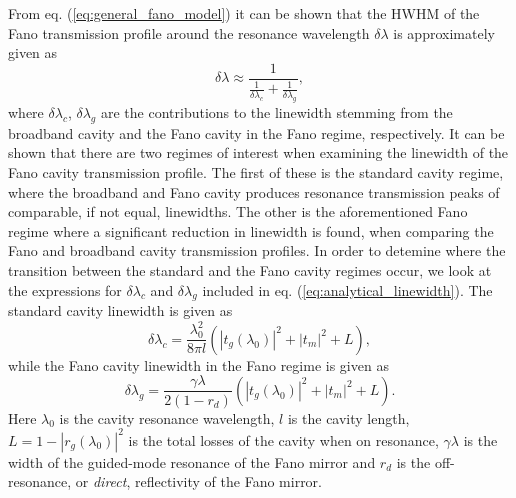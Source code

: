 From eq. (\ref{eq:general_fano_model}) it can be shown that the HWHM of the Fano transmission profile around the resonance wavelength $\delta \lambda$ is approximately given as
\begin{equation}
    \delta \lambda \approx \frac{1}{\frac{1}{\delta \lambda_c} + \frac{1}{\delta \lambda_g}},
    \label{eq:analytical_linewidth}
\end{equation}
where $\delta \lambda_c$, $\delta \lambda_g$ are the contributions to the linewidth stemming from the broadband cavity and the Fano cavity in the Fano regime, respectively. It can be shown that there are two regimes of interest when examining the linewidth of the Fano cavity transmission profile. The first of these is the standard cavity regime, where the broadband and Fano cavity produces resonance transmission peaks of comparable, if not equal, linewidths. The other is the aforementioned Fano regime where a significant reduction in linewidth is found, when comparing the Fano and broadband cavity transmission profiles. In order to detemine where the transition between the standard and the Fano cavity regimes occur, we look at the expressions for $\delta \lambda_c$ and $\delta \lambda_g$ included in eq. (\ref{eq:analytical_linewidth}). The standard cavity linewidth is given as
\begin{equation}
    \delta \lambda_c = \frac{\lambda_0^2}{8 \pi l} (|t_g(\lambda_0)|^2 + |t_m|^2 + L),
    \label{eq:analytical_linewidth_broadband}
\end{equation}
while the Fano cavity linewidth in the Fano regime is given as
\begin{equation}
    \delta \lambda_g = \frac{\gamma \lambda}{2 (1-r_d)}(|t_g(\lambda_0)|^2 + |t_m|^2 + L).
\end{equation}
Here $\lambda_0$ is the cavity resonance wavelength, $l$ is the cavity length, $L = 1 - |r_g(\lambda_0)|^2$ is the total losses of the cavity when on resonance, $\gamma \lambda$ is the width of the guided-mode resonance of the Fano mirror and $r_d$ is the off-resonance, or \emph{direct}, reflectivity of the Fano mirror.

